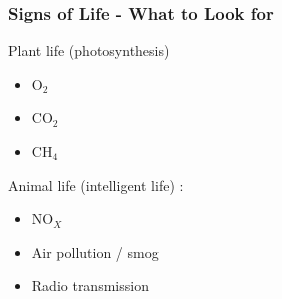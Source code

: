 \documentclass{beamer}
\begin{document}
\begin{frame}
\frametitle{Signs of Life - What to Look for}
Plant life (photosynthesis)
\begin{itemize}
    \item $\text{O}_{2}$
    \pause
    \item $\text{CO}_{2}$
    \pause
    \item $\text{CH}_{4}$
    \pause
\end{itemize}

Animal life (intelligent life) : 
\begin{itemize}
    \item $\text{NO}_{X}$
    \pause
    \item Air pollution / smog
    \pause
    \item Radio transmission
\end{itemize}
\end{frame}

\end{document}
